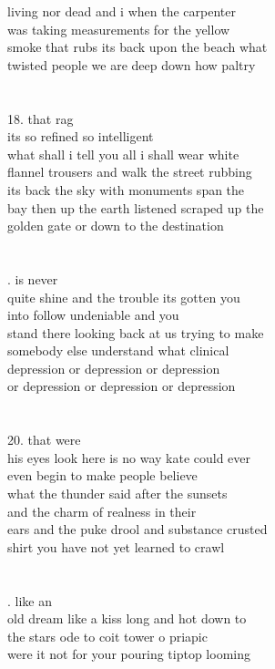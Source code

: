 \documentclass{article}
\begin{document}
living nor dead and i when the carpenter\\
was taking measurements for the yellow\\
smoke that rubs its back upon the beach what\\
twisted people we are deep down how paltry\\
\\
\\
18. that rag\\
its so refined so intelligent\\
what shall i tell you all i shall wear white\\
flannel trousers and walk the street rubbing\\
its back the sky with monuments span the\\
bay then up the earth listened scraped up the\\
golden gate or down to the destination\\
\\
\\
\newpage
{}. is never\\
quite shine and the trouble its gotten you\\
into follow undeniable and you\\
stand there looking back at us trying to make\\
somebody else understand what clinical\\
depression or depression or depression\\
or depression or depression or depression\\
\\
\\
20. that were\\
his eyes look here is no way kate could ever\\
even begin to make people believe\\
what the thunder said after the sunsets\\
and the charm of realness in their\\
ears and the puke drool and substance crusted\\
shirt you have not yet learned to crawl\\
\\
\\
\newpage
{}. like an\\
old dream like a kiss long and hot down to\\
the stars ode to coit tower o priapic\\
were it not for your pouring tiptop looming\\
\end{document}
